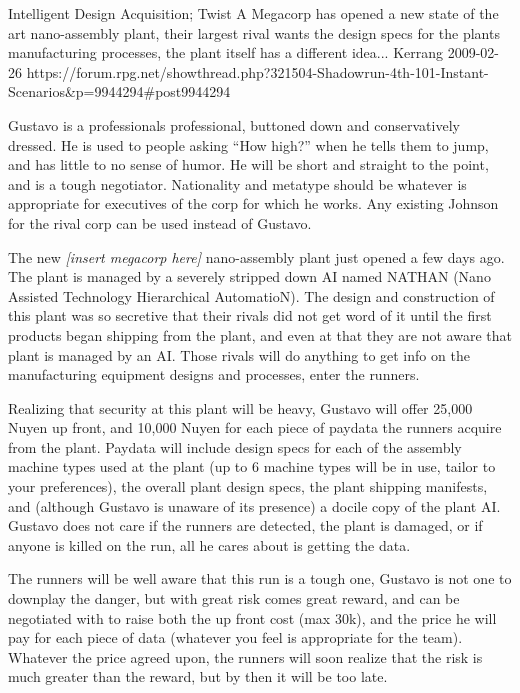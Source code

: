 \begin{scenario}{Intelligent Design}
	{Acquisition; Twist}
	{A Megacorp has opened a new state of the art nano-assembly plant, their largest rival wants the design specs for the plants manufacturing processes, the plant itself has a different idea...}
	{Kerrang}
	{2009-02-26}
	{https://forum.rpg.net/showthread.php?321504-Shadowrun-4th-101-Instant-Scenarios\&p=9944294\#post9944294}

 Gustavo is a professionals professional, buttoned down and conservatively dressed. He is used to people asking ``How high?'' when he tells them to jump, and has little to no sense of humor. He will be short and straight to the point, and is a tough negotiator. Nationality and metatype should be whatever is appropriate for executives of the corp for which he works. Any existing Johnson for the rival corp can be used instead of Gustavo.

\synopsis The new \textit{[insert megacorp here]} nano-assembly plant just opened a few days ago. The plant is managed by a severely stripped down AI named NATHAN (Nano Assisted Technology Hierarchical AutomatioN). The design and construction of this plant was so secretive that their rivals did not get word of it until the first products began shipping from the plant, and even at that they are not aware that plant is managed by an AI. Those rivals will do anything to get info on the manufacturing equipment designs and processes, enter the runners.

Realizing that security at this plant will be heavy, Gustavo will offer 25,000 Nuyen up front, and 10,000 Nuyen for each piece of paydata the runners acquire from the plant. Paydata will include design specs for each of the assembly machine types used at the plant (up to 6 machine types will be in use, tailor to your preferences), the overall plant design specs, the plant shipping manifests, and (although Gustavo is unaware of its presence) a docile copy of the plant AI. Gustavo does not care if the runners are detected, the plant is damaged, or if anyone is killed on the run, all he cares about is getting the data.

The runners will be well aware that this run is a tough one, Gustavo is not one to downplay the danger, but with great risk comes great reward, and can be negotiated with to raise both the up front cost (max 30k), and the price he will pay for each piece of data (whatever you feel is appropriate for the team). Whatever the price agreed upon, the runners will soon realize that the risk is much greater than the reward, but by then it will be too late.


\end{scenario}
